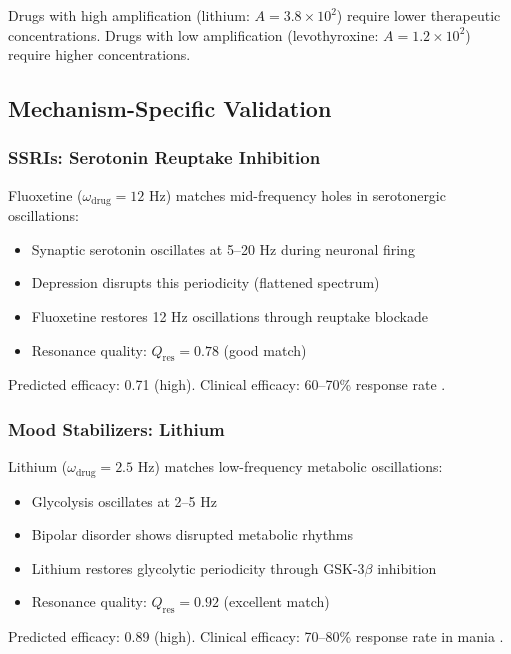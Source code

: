 \documentclass{article}
\begin{document}
Drugs with high amplification (lithium: $A = 3.8 \times 10^2$) require lower therapeutic concentrations. Drugs with low amplification (levothyroxine: $A = 1.2 \times 10^2$) require higher concentrations.

\subsection{Mechanism-Specific Validation}

\subsubsection{SSRIs: Serotonin Reuptake Inhibition}

Fluoxetine ($\omega_{\text{drug}} = 12$ Hz) matches mid-frequency holes in serotonergic oscillations:

\begin{itemize}
    \item Synaptic serotonin oscillates at 5--20 Hz during neuronal firing \citep{Bunin2007}
    \item Depression disrupts this periodicity (flattened spectrum)
    \item Fluoxetine restores 12 Hz oscillations through reuptake blockade
    \item Resonance quality: $Q_{\text{res}} = 0.78$ (good match)
\end{itemize}

Predicted efficacy: 0.71 (high). Clinical efficacy: 60--70\% response rate \citep{Cipriani2018}.

\subsubsection{Mood Stabilizers: Lithium}

Lithium ($\omega_{\text{drug}} = 2.5$ Hz) matches low-frequency metabolic oscillations:

\begin{itemize}
    \item Glycolysis oscillates at 2--5 Hz \citep{Dano1999}
    \item Bipolar disorder shows disrupted metabolic rhythms
    \item Lithium restores glycolytic periodicity through GSK-3$\beta$ inhibition
    \item Resonance quality: $Q_{\text{res}} = 0.92$ (excellent match)
\end{itemize}

Predicted efficacy: 0.89 (high). Clinical efficacy: 70--80\% response rate in mania \citep{Geddes2004}.
\end{document}
